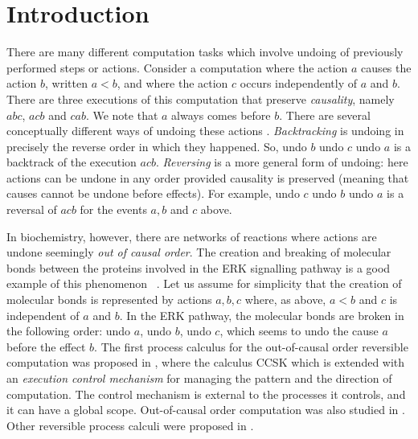 \documentclass[preprint,12pt]{elsarticle}
\begin{document}

\section{Introduction}
There are many different computation tasks which involve undoing of previously 
performed steps or actions. Consider a computation where the action $a$ causes the action $b$,
written $a<b$, and where the action $c$ occurs independently of $a$ and $b$.
There are three  executions of this computation that preserve \emph{causality},
namely $abc$, $acb$ and $cab$. We note that $a$ always comes before $b$.
There are several conceptually different ways of undoing these actions
\cite{UPY2014}. {\em Backtracking}
is undoing in precisely the reverse order in which they happened. So, undo $b$ undo $c$ undo
$a$ is a backtrack of the execution $acb$.
{\em Reversing\/} is a more general form of undoing: here actions can be undone in any
order provided causality is preserved (meaning that causes cannot be undone before effects).
For example, undo $c$ undo $b$ undo $a$ is a reversal of $acb$ for the events $a,b$ 
and $c$ above.


In biochemistry, however, there are networks of reactions
where actions are undone seemingly \emph{out of causal order}.
The creation and breaking of molecular bonds between the proteins involved
in the ERK signalling pathway is a good example 
of this phenomenon ~\cite{PUY12}. Let us assume for simplicity that the creation of molecular 
bonds is represented by actions $a,b,c$ where, as above, $a<b$ and $c$ is independent 
of $a$ and $b$. In the ERK pathway, the molecular bonds are broken in the following 
order: undo $a$, undo $b$, undo $c$, which seems to undo the cause $a$ before the effect $b$. 
The first process calculus for the out-of-causal order
reversible computation was proposed in \cite{PUY12}, where the calculus CCSK 
\cite{PhiUli07} which is extended with an \emph{execution control mechanism} for 
managing the pattern and the direction of computation. The control mechanism is external
to the processes it controls, and it can have a global scope. Out-of-causal order computation
was also studied in \cite{PUY13a,PU13b}.
Other reversible process 
calculi were proposed in \cite{DK04,DK07,PU06,PhiUli07,LaneseMS10,LMSS11,LMS12,CKV13}.
\end{document}

